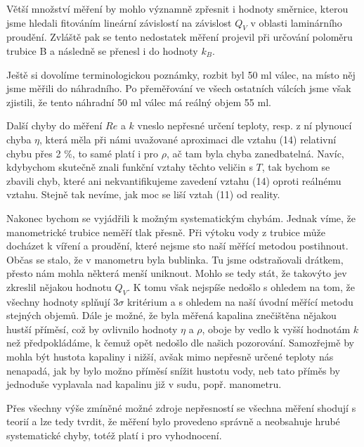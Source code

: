 \documentclass[a4paper]{article}
\begin{document}
\par Větší množství měření by mohlo významně zpřesnit i hodnoty směrnice, kterou jsme hledali fitováním lineární závislostí na závislost $Q_{V}$ v oblasti laminárního proudění. Zvláště pak se tento nedostatek měření projevil při určování poloměru trubice B a následně se přenesl i do hodnoty $k_{B}$.
\par Ještě si dovolíme terminologickou poznámky, rozbit byl 50 ml válec, na místo něj jsme měřili do náhradního. Po přeměřování ve všech ostatních válcích jsme však zjistili, že tento náhradní 50 ml válec má reálný objem 55 ml.
\par Další chyby do měření $Re$ a $k$  vneslo nepřesné určení teploty, resp. z ní plynoucí chyba $\eta$, která měla při námi uvažované aproximaci dle vztahu (14) relativní chybu přes 2 $\%$, to samé platí i pro $\rho$, ač tam byla chyba zanedbatelná. Navíc, kdybychom skutečně znali funkční vztahy těchto veličin s $T$, tak bychom se zbavili chyb, které ani nekvantifikujeme zavedení vztahu (14) oproti reálnému vztahu. Stejně tak nevíme, jak moc se liší vztah (11) od reality.
\par Nakonec bychom se vyjádřili k možným systematickým chybám. Jednak víme, že manometrické trubice neměří tlak přesně. Při výtoku vody z trubice může docházet k víření a proudění, které nejsme sto naší měřící metodou postihnout. Občas se stalo, že v manometru byla bublinka. Tu jsme odstraňovali drátkem, přesto nám mohla některá menší uniknout. Mohlo se tedy stát, že takovýto jev zkreslil nějakou hodnotu $Q_{V}$. K tomu však nejspíše nedošlo s ohledem na tom, že všechny hodnoty splňují $3 \sigma$ kritérium a s ohledem na naší úvodní měřící metodu stejných objemů. Dále je možné, že byla měřená kapalina znečištěna nějakou hustší příměsí, což by ovlivnilo hodnoty $\eta$ a $\rho$, oboje by vedlo k vyšší hodnotám $k$ než předpokládáme, k čemuž opět nedošlo dle našich pozorování. Samozřejmě by mohla být hustota kapaliny i nižší, avšak mimo nepřesně určené teploty nás nenapadá, jak by bylo možno příměsí snížit hustotu vody, neb tato příměs by jednoduše vyplavala nad kapalinu již v sudu, popř. manometru.
\par Přes všechny výše zmíněné možné zdroje nepřesností se všechna měření shodují s teorií a lze tedy tvrdit, že měření bylo provedeno správně a neobsahuje hrubé systematické chyby, totéž platí i pro vyhodnocení.
\end{document}
